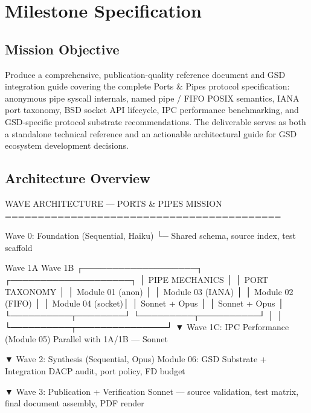 \documentclass[11pt,letterpaper]{article}
\newcommand{\stageheader}[2]{%
  \noindent\colorbox{#2}{\makebox[\textwidth][l]{%
    \textcolor{white}{\bfseries\sffamily\hspace{6pt}#1\hspace{6pt}}}}%
  \vspace{0.5em}\par%
}
\begin{document}
\newpage
\stageheader{STAGE 3 --- MISSION PACKAGE}{tertiary}

\section{Milestone Specification}

\subsection{Mission Objective}

Produce a comprehensive, publication-quality reference document and GSD integration guide covering the complete Ports \& Pipes protocol specification: anonymous pipe syscall internals, named pipe / FIFO POSIX semantics, IANA port taxonomy, BSD socket API lifecycle, IPC performance benchmarking, and GSD-specific protocol substrate recommendations. The deliverable serves as both a standalone technical reference and an actionable architectural guide for GSD ecosystem development decisions.

\subsection{Architecture Overview}

\begin{asciibox}
WAVE ARCHITECTURE — PORTS & PIPES MISSION
==========================================

Wave 0: Foundation (Sequential, Haiku)
  └─ Shared schema, source index, test scaffold

          Wave 1A                      Wave 1B
  ┌───────────────────┐       ┌────────────────────┐
  │  PIPE MECHANICS   │       │  PORT TAXONOMY     │
  │  Module 01 (anon) │       │  Module 03 (IANA)  │
  │  Module 02 (FIFO) │       │  Module 04 (socket)│
  │  Sonnet + Opus    │       │  Sonnet + Opus     │
  └──────────┬────────┘       └─────────┬──────────┘
             │                          │
             └──────────┬───────────────┘
                        ▼
             Wave 1C: IPC Performance (Module 05)
             Parallel with 1A/1B — Sonnet

                        ▼
             Wave 2: Synthesis (Sequential, Opus)
             Module 06: GSD Substrate + Integration
             DACP audit, port policy, FD budget

                        ▼
             Wave 3: Publication + Verification
             Sonnet — source validation, test matrix,
             final document assembly, PDF render
\end{asciibox}
\end{document}
